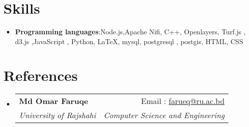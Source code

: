 \documentclass[a4paper,11pt]{article}
\makeatletter
\newcommand{\resumeSubheading}[4]{
    \vspace{-1pt}\item
    \begin{tabular*}{0.97\textwidth}{l@{\extracolsep{\fill}}r}
        \textbf{#1}       & #2                 \\
        \textit{\small#3} & \textit{\small #4} \\
    \end{tabular*}\vspace{-5pt}
}
\newcommand{\resumeSubHeadingListStart}{\begin{itemize}[leftmargin=*]}
\newcommand{\resumeSubHeadingListEnd}{\end{itemize}}
\makeatother
\begin{document}
\section{Skills}
\resumeSubHeadingListStart
\item{ \textbf{Programming languages}{:Node.js,Apache Nifi, C++, Openlayers, Turf.js , d3.js ,JavaScript , Python, \LaTeX, mysql, postgresql , postgis, HTML, CSS} }
\resumeSubHeadingListEnd

\section{References}
\resumeSubHeadingListStart

\resumeSubheading
{Md Omar Faruqe}{Email : \href{farueq@ru.ac.bd}{farueq@ru.ac.bd}}
{University of Rajshahi}{Computer Science and Engineering}


\resumeSubHeadingListEnd

\end{document}
